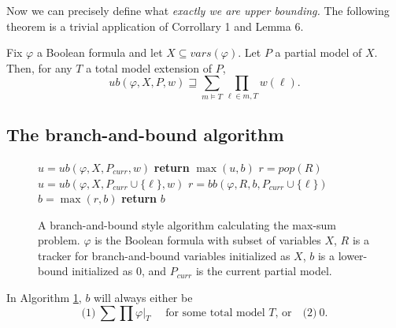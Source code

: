 \documentclass[acmsmall,review]{acmart}\settopmatter{printfolios=true,printccs=false,printacmref=false}
\begin{document}
Now we can precisely define what \textit{exactly we are upper bounding.} The following theorem is a trivial application of Corrollary 1 and Lemma 6.

\begin{theorem}
  Fix $\varphi$ a Boolean formula and let $X \subseteq vars(\varphi)$. Let $P$ a partial model of $X$. Then, for any $T$ a total model extension of $P$,
  \begin{equation}
    ub(\varphi, X, P, w) \sqsupseteq \sum_{m \models T} \prod_{\ell \in m, T} w(\ell).
  \end{equation}
\end{theorem}

\subsection{The branch-and-bound algorithm}

\begin{figure}[H]
  \begin{mdframed}{\begin{algorithmic}[1]
      \State $u = ub(\varphi, X, P_{curr}, w)$ 
      \State \textbf{return } $\max(u, b)$
    \Else
       \State $r = pop(R)$
        \State $u = ub(\varphi, X, P_{curr} \cup \{\ell\},w)$
          \State $r = bb(\varphi, R, b, P_{curr} \cup \{\ell\})$ 
          \State $b = \max(r,b)$
        \EndIf
        \State \textbf{return } $b$
       \EndFor
    \EndIf
  \EndProcedure
  \end{algorithmic}}\end{mdframed}
  \caption{A branch-and-bound style algorithm calculating the max-sum problem. $\varphi$ is the Boolean formula with subset of variables $X$, $R$ is a tracker for branch-and-bound variables initialized as $X$, $b$ is a lower-bound initialized as $0$, and $P_{curr}$ is the current partial model.}
  \label{bb algo}
\end{figure}

\begin{lemma}\label{totality of bb}
  In Algorithm \ref{bb algo}, $b$ will always either be
  \begin{equation*}
    \text{(1)}\ \sum\prod \varphi|_T \quad \text{ for some total model $T$, or} \quad \text{(2)}\  0. 
  \end{equation*}
\end{lemma}
\end{document}
